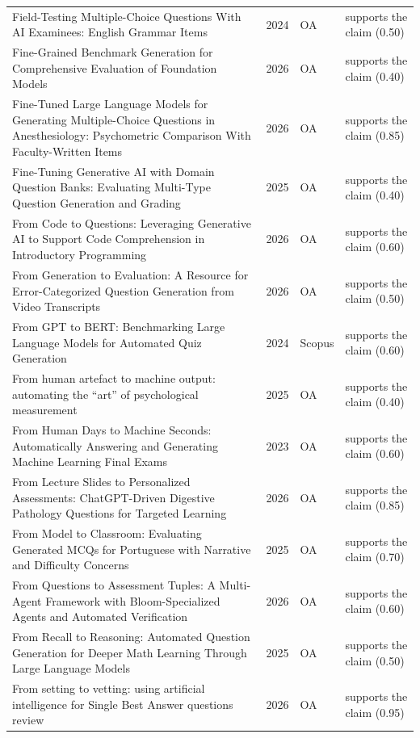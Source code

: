 \begin{longtable}{@{}%
  >{\raggedright\arraybackslash}p{}c%
  >{\raggedright\arraybackslash}p{}%
  >{\raggedright\arraybackslash}p{}@{}}
Field-Testing Multiple-Choice Questions With AI Examinees: English Grammar Items & 2024 & OA & supports the claim (0.50) \\
Fine-Grained Benchmark Generation for Comprehensive Evaluation of Foundation Models & 2026 & OA & supports the claim (0.40) \\
Fine-Tuned Large Language Models for Generating Multiple-Choice Questions in Anesthesiology: Psychometric Comparison With Faculty-Written Items & 2026 & OA & supports the claim (0.85) \\
Fine-Tuning Generative AI with Domain Question Banks: Evaluating Multi-Type Question Generation and Grading & 2025 & OA & supports the claim (0.40) \\
From Code to Questions: Leveraging Generative AI to Support Code Comprehension in Introductory Programming & 2026 & OA & supports the claim (0.60) \\
From Generation to Evaluation: A Resource for Error-Categorized Question Generation from Video Transcripts & 2026 & OA & supports the claim (0.50) \\
From GPT to BERT: Benchmarking Large Language Models for Automated Quiz Generation & 2024 & Scopus & supports the claim (0.60) \\
From human artefact to machine output: automating the ``art'' of psychological measurement & 2025 & OA & supports the claim (0.40) \\
From Human Days to Machine Seconds: Automatically Answering and Generating Machine Learning Final Exams & 2023 & OA & supports the claim (0.60) \\
From Lecture Slides to Personalized Assessments: ChatGPT-Driven Digestive Pathology Questions for Targeted Learning & 2026 & OA & supports the claim (0.85) \\
From Model to Classroom: Evaluating Generated MCQs for Portuguese with Narrative and Difficulty Concerns & 2025 & OA & supports the claim (0.70) \\
From Questions to Assessment Tuples: A Multi-Agent Framework with Bloom-Specialized Agents and Automated Verification & 2026 & OA & supports the claim (0.60) \\
From Recall to Reasoning: Automated Question Generation for Deeper Math Learning Through Large Language Models & 2025 & OA & supports the claim (0.50) \\
From setting to vetting: using artificial intelligence for Single Best Answer questions review & 2026 & OA & supports the claim (0.95) \\

\end{longtable}
